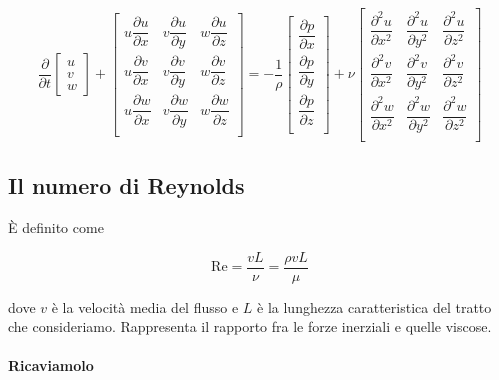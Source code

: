 \documentclass[12pt,a4paper]{article}
\numberwithin{equation}{section}
\begin{document}
\renewcommand{\arraystretch}{2}
\begin{equation}
\frac{\partial}{\partial t} \begin{bmatrix}
u \\
v \\
w 
\end{bmatrix} +
\begin{bmatrix}
u \dfrac{\partial u}{\partial x} & v \dfrac{\partial u}{\partial y} & w \dfrac{\partial u}{\partial z} \\
u \dfrac{\partial v}{\partial x} & v \dfrac{\partial v}{\partial y} & w \dfrac{\partial v}{\partial z} \\
u \dfrac{\partial w}{\partial x} & v \dfrac{\partial w}{\partial y} & w \dfrac{\partial w}{\partial z} \\
\end{bmatrix} =
-\dfrac{1}{\rho}
\begin{bmatrix}
\dfrac{\partial p}{\partial x} \\
\dfrac{\partial p}{\partial y} \\
\dfrac{\partial p}{\partial z} \\
\end{bmatrix} +
\nu 
\begin{bmatrix}
\dfrac{\partial^2 u}{\partial x^2} & \dfrac{\partial^2 u}{\partial y^2} & \dfrac{\partial^2 u}{\partial z^2} \\
\dfrac{\partial^2 v}{\partial x^2} & \dfrac{\partial^2 v}{\partial y^2} & \dfrac{\partial^2 v}{\partial z^2} \\
\dfrac{\partial^2 w}{\partial x^2} & \dfrac{\partial^2 w}{\partial y^2} & \dfrac{\partial^2 w}{\partial z^2} \\
\end{bmatrix}
\end{equation}

\subsection{Il numero di Reynolds}

È definito come

\begin{equation}
\text{Re} = \frac{v L}{\nu} = \frac{\rho v L}{\mu}
\end{equation}

dove $v$ è la velocità media del flusso e $L$ è la lunghezza caratteristica del tratto che consideriamo.
Rappresenta il rapporto fra le forze inerziali e quelle viscose.

\paragraph{Ricaviamolo}
\end{document}
